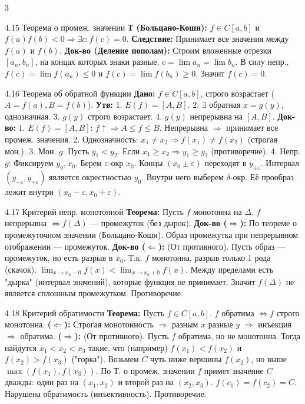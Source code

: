 \documentclass[8pt, a4paper, landscape]{extarticle}
\newcommand{\Ra}{\Rightarrow}
\begin{document}
\begin{multicols*}{3}
\begin{ticket}{4.15 Теорема о промеж. значении}
\textbf{Т (Больцано-Коши):} $f \in C[a, b]$ и $f(a)f(b) < 0 \Ra \exists c: f(c)=0$.
\textbf{Следствие:} Принимает все значения между $f(a)$ и $f(b)$.
\tcblower
\textbf{Док-во (Деление пополам):}
Строим вложенные отрезки $[a_n, b_n]$, на концах которых знаки разные.
$c = \lim a_n = \lim b_n$.
В силу непр., $f(c) = \lim f(a_n) \le 0$ и $f(c) = \lim f(b_n) \ge 0$.
Значит $f(c) = 0$.
\end{ticket}

\begin{ticket}{4.16 Теорема об обратной функции}
\textbf{Дано:} $f \in C[a, b]$, строго возрастает ($A=f(a), B=f(b)$).
\textbf{Утв:}
1. $E(f) = [A, B]$.
2. $\exists$ обратная $x = g(y)$, однозначная.
3. $g(y)$ строго возрастает.
4. $g(y)$ непрерывна на $[A, B]$.
\tcblower
\textbf{Док-во:}
1. $E(f)=[A,B]$: $f \uparrow \Ra A \le f \le B$. Непрерывна $\Ra$ принимает все промеж. значения.
2. Однозначность: $x_1 \ne x_2 \Ra f(x_1) \ne f(x_2)$ (строгая мон.).
3. Мон. $g$: Пусть $y_1 < y_2$. Если $x_1 \ge x_2 \Ra y_1 \ge y_2$ (противоречие).
4. Непр. $g$: Фиксируем $y_0, x_0$. Берем $\varepsilon$-окр $x_0$.
Концы $(x_0 \pm \varepsilon)$ переходят в $y_{\pm \varepsilon}$.
Интервал $(y_{-\varepsilon}, y_{+\varepsilon})$ является окрестностью $y_0$.
Внутри него выберем $\delta$-окр.
Её прообраз лежит внутри $(x_0-\varepsilon, x_0+\varepsilon)$.
\end{ticket}

\begin{ticket}{4.17 Критерий непр. монотонной}
\textbf{Теорема:} Пусть $f$ монотонна на $\Delta$.
$f$ непрерывна $\iff f(\Delta)$ — промежуток (без дырок).
\tcblower
\textbf{Док-во ($\Ra$):}
По теореме о промежуточном значении (Больцано-Коши).
Образ промежутка при непрерывном отображении — промежуток.
\textbf{Док-во ($\Leftarrow$):} (От противного).
Пусть образ — промежуток, но есть разрыв в $x_0$.
Т.к. $f$ монотонна, разрыв только 1 рода (скачок).
$\lim_{x\to x_0-0} f(x) < \lim_{x\to x_0+0} f(x)$.
Между пределами есть "дырка" (интервал значений), которые функция не принимает.
Значит $f(\Delta)$ не является сплошным промежутком. Противоречие.
\end{ticket}

\begin{ticket}{4.18 Критерий обратимости}
\textbf{Теорема:} Пусть $f \in C[a, b]$.
$f$ обратима $\iff f$ строго монотонна.
\tcblower
\textbf{($\Leftarrow$):} Строгая монотонность $\Ra$ разным $x$ разные $y$ $\Ra$ инъекция $\Ra$ обратима.
\textbf{($\Rightarrow$):} (От противного).
Пусть $f$ обратима, но не монотонна.
Тогда найдутся $x_1 < x_2 < x_3$ такие, что (например) $f(x_1) < f(x_2)$ и $f(x_2) > f(x_3)$ ("горка").
Возьмем $C$ чуть ниже вершины $f(x_2)$, но выше $\max(f(x_1), f(x_3))$.
По Т. о промеж. значении $f$ примет значение $C$ дважды:
один раз на $(x_1, x_2)$ и второй раз на $(x_2, x_3)$.
$f(c_1) = f(c_2) = C$.
Нарушена обратимость (инъективность). Противоречие.
\end{ticket}


\end{multicols*}
\end{document}
